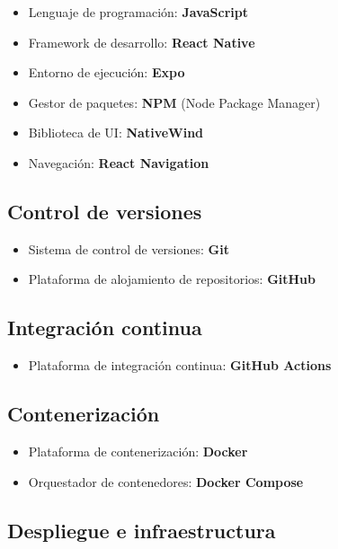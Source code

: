 \begin{itemize}
    \item Lenguaje de programación: \textbf{JavaScript}
    \item Framework de desarrollo: \textbf{React Native}
    \item Entorno de ejecución: \textbf{Expo}
    \item Gestor de paquetes: \textbf{NPM} (Node Package Manager)
    \item Biblioteca de UI: \textbf{NativeWind}
    \item Navegación: \textbf{React Navigation}
\end{itemize}

\subsection{Control de versiones}

\begin{itemize}
    \item Sistema de control de versiones: \textbf{Git}
    \item Plataforma de alojamiento de repositorios: \textbf{GitHub}
\end{itemize}

\subsection{Integración continua}

\begin{itemize}
    \item Plataforma de integración continua: \textbf{GitHub Actions}
\end{itemize}

\subsection{Contenerización}

\begin{itemize}
    \item Plataforma de contenerización: \textbf{Docker}
    \item Orquestador de contenedores: \textbf{Docker Compose}
\end{itemize}

\subsection{Despliegue e infraestructura}

